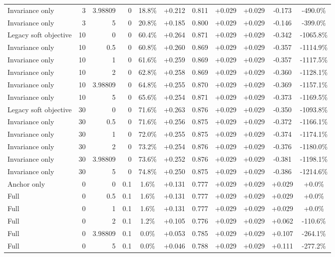 \begin{table}[htbp]
\begin{tabular}{lrrrccccccc}
Invariance only & 3 & 3.98809 & 0 & 18.8\% & +0.212 & 0.811 & +0.029 & +0.029 & -0.173 & -490.0\% \\
Invariance only & 3 & 5 & 0 & 20.8\% & +0.185 & 0.800 & +0.029 & +0.029 & -0.146 & -399.0\% \\
Legacy soft objective & 10 & 0 & 0 & 60.4\% & +0.264 & 0.871 & +0.029 & +0.029 & -0.342 & -1065.8\% \\
Invariance only & 10 & 0.5 & 0 & 60.8\% & +0.260 & 0.869 & +0.029 & +0.029 & -0.357 & -1114.9\% \\
Invariance only & 10 & 1 & 0 & 61.6\% & +0.259 & 0.869 & +0.029 & +0.029 & -0.357 & -1117.5\% \\
Invariance only & 10 & 2 & 0 & 62.8\% & +0.258 & 0.869 & +0.029 & +0.029 & -0.360 & -1128.1\% \\
Invariance only & 10 & 3.98809 & 0 & 64.8\% & +0.255 & 0.870 & +0.029 & +0.029 & -0.369 & -1157.1\% \\
Invariance only & 10 & 5 & 0 & 65.6\% & +0.254 & 0.871 & +0.029 & +0.029 & -0.373 & -1169.5\% \\
Legacy soft objective & 30 & 0 & 0 & 71.6\% & +0.263 & 0.876 & +0.029 & +0.029 & -0.350 & -1093.8\% \\
Invariance only & 30 & 0.5 & 0 & 71.6\% & +0.256 & 0.875 & +0.029 & +0.029 & -0.372 & -1166.1\% \\
Invariance only & 30 & 1 & 0 & 72.0\% & +0.255 & 0.875 & +0.029 & +0.029 & -0.374 & -1174.1\% \\
Invariance only & 30 & 2 & 0 & 73.2\% & +0.254 & 0.876 & +0.029 & +0.029 & -0.376 & -1180.0\% \\
Invariance only & 30 & 3.98809 & 0 & 73.6\% & +0.252 & 0.876 & +0.029 & +0.029 & -0.381 & -1198.1\% \\
Invariance only & 30 & 5 & 0 & 74.8\% & +0.250 & 0.875 & +0.029 & +0.029 & -0.386 & -1214.6\% \\
Anchor only & 0 & 0 & 0.1 & 1.6\% & +0.131 & 0.777 & +0.029 & +0.029 & +0.029 & +0.0\% \\
Full & 0 & 0.5 & 0.1 & 1.6\% & +0.131 & 0.777 & +0.029 & +0.029 & +0.029 & +0.0\% \\
Full & 0 & 1 & 0.1 & 1.6\% & +0.131 & 0.777 & +0.029 & +0.029 & +0.029 & +0.0\% \\
Full & 0 & 2 & 0.1 & 1.2\% & +0.105 & 0.776 & +0.029 & +0.029 & +0.062 & -110.6\% \\
Full & 0 & 3.98809 & 0.1 & 0.0\% & +0.053 & 0.785 & +0.029 & +0.029 & +0.107 & -264.1\% \\
Full & 0 & 5 & 0.1 & 0.0\% & +0.046 & 0.788 & +0.029 & +0.029 & +0.111 & -277.2\% \\

\end{tabular}
\end{table}
